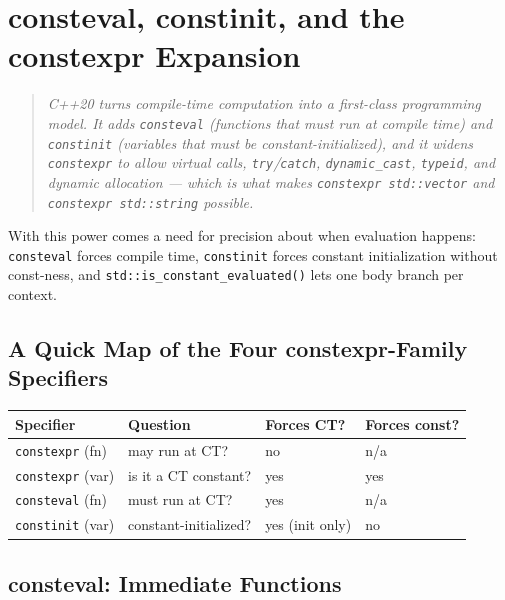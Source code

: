 \chapter{consteval, constinit, and the constexpr Expansion}
\label{ch:c20-constexpr-family}

\begin{quote}
\emph{C++20 turns compile-time computation into a first-class programming model. It adds \texttt{consteval} (functions that must run at compile time) and \texttt{constinit} (variables that must be constant-initialized), and it widens \texttt{constexpr} to allow virtual calls, \texttt{try}/\texttt{catch}, \texttt{dynamic\_cast}, \texttt{typeid}, and dynamic allocation --- which is what makes \texttt{constexpr std::vector} and \texttt{constexpr std::string} possible.}
\end{quote}

With this power comes a need for precision about when evaluation happens: \texttt{consteval} forces compile time, \texttt{constinit} forces constant initialization without const-ness, and \texttt{std::is\_constant\_evaluated()} lets one body branch per context.

\section{A Quick Map of the Four constexpr-Family Specifiers}
\label{sec:c20-constexpr-map}

\begin{center}
\begin{tabular}{llll}
\hline
\textbf{Specifier} & \textbf{Question} & \textbf{Forces CT?} & \textbf{Forces const?} \\
\hline
\texttt{constexpr} (fn) & may run at CT? & no & n/a \\
\texttt{constexpr} (var) & is it a CT constant? & yes & yes \\
\texttt{consteval} (fn) & must run at CT? & yes & n/a \\
\texttt{constinit} (var) & constant-initialized? & yes (init only) & no \\
\hline
\end{tabular}
\end{center}

\section{consteval: Immediate Functions}
\label{sec:c20-consteval}

